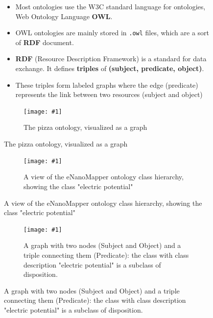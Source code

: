 \documentclass[english, xcolor=dvipsnames, aspectratio=169]{beamer}
\newcommand{\includefigurelarger}[2]
{
    \begin{figure}[h]
    \caption{#2}
    \centering
    \texttt{[image: \#1]}
    \end{figure}
}
\newcommand{\includefiguremediumlarger}[2]
{
    \begin{figure}[h]
    \caption{#2}
    \centering
    \texttt{[image: \#1]}
    \end{figure}
}
\newcommand{\subsectiontitle}{}
\begin{document}
\begin{frame}{\subsectiontitle}
    \begin{figure}
        \begin{minipage}[b]{0.55\linewidth}
 			\begin{itemize}
\item Most ontologies use the W3C standard language for ontologies, Web Ontology Language \textbf{OWL}.
\item OWL ontologies are mainly stored in \texttt{.owl} files, which are a sort of \textbf{RDF} document.
\item \textbf{RDF} (Resource Description Framework) is a standard for data exchange. It defines \textbf{triples} of \textbf{(subject, predicate, object)}. \cite{noauthor_rdf_nodate}
\item These triples form labeled graphs where the edge (predicate) represents the link between two resources (subject and object)
    		\end{itemize}
        \end{minipage}
    \hfill
     \begin{minipage}[b]{0.4\linewidth}
            \centering
            \includefigurelarger{pizzaontology.png}{The pizza ontology, visualized as a graph \cite{drummond_pizza_nodate}}
        \end{minipage}
    \end{figure}
\end{frame}


% 

\begin{frame}{\subsectiontitle}
\begin{figure}
    
    \centering
	\includefiguremediumlarger{class-hierarchy.png}{A view of the eNanoMapper ontology class hierarchy, showing the class "electric potential"}
    \end{figure}
\end{frame}

% 
\begin{frame}{\subsectiontitle}

     
\begin{figure}
    
    \centering
	\includefigurelarger{rdf-graph-triple.pdf}{A graph with two nodes (Subject and Object) and a triple connecting them (Predicate): the class with class description "electric potential" is a subclass of disposition.}
    \end{figure}
\end{frame}
\end{document}
